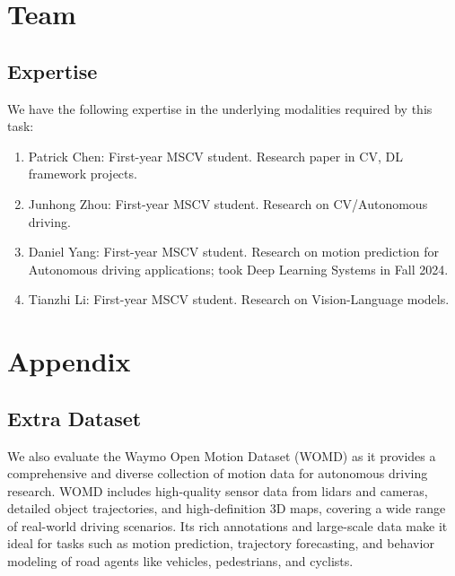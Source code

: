 \documentclass{article} %
\begin{document}
	
	\clearpage
	
	\section{Team}
	\subsection{ Expertise }
	We have the following expertise in the underlying modalities required by this task:
	\begin{enumerate}
		\item Patrick Chen: First-year MSCV student. Research paper in CV, DL framework projects.
		\item Junhong Zhou: First-year MSCV student. Research on CV/Autonomous driving.
		\item Daniel Yang: First-year MSCV student. Research on motion prediction for Autonomous driving applications; took Deep Learning Systems in Fall 2024.
		\item Tianzhi Li: First-year MSCV student. Research on Vision-Language models.
	\end{enumerate}
	
	\clearpage
	
	
	
	
	
	\appendix
	\section{Appendix}
	\subsection{Extra Dataset}
	We also evaluate the Waymo Open Motion Dataset (WOMD)\cite{Ettinger2021LargeSI} as it provides a comprehensive and diverse collection of motion data for autonomous driving research. WOMD includes high-quality sensor data from lidars and cameras, detailed object trajectories, and high-definition 3D maps, covering a wide range of real-world driving scenarios. Its rich annotations and large-scale data make it ideal for tasks such as motion prediction, trajectory forecasting, and behavior modeling of road agents like vehicles, pedestrians, and cyclists.
	
\end{document}

